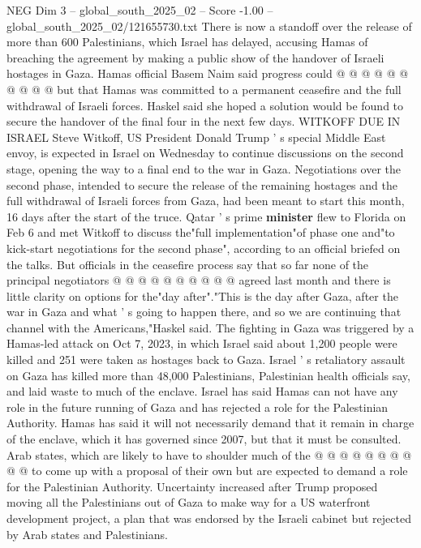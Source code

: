 \begin{textsample}{NEG Dim 3 – global\_south\_2025\_02 – Score -1.00 – global\_south\_2025\_02/121655730.txt}
There is now a standoff over the release of more than 600 Palestinians, which Israel has delayed, accusing Hamas of breaching the agreement by making a public show of the handover of Israeli hostages in Gaza.
Hamas official Basem Naim said progress could @ @ @ @ @ @ @ @ @ @ but that Hamas was committed to a permanent ceasefire and the full withdrawal of Israeli forces.
Haskel said she hoped a solution would be found to secure the handover of the final four in the next few days.
WITKOFF DUE IN ISRAEL Steve Witkoff, US President Donald Trump ' s special Middle East envoy, is expected in Israel on Wednesday to continue discussions on the second stage, opening the way to a final end to the war in Gaza.
Negotiations over the second phase, intended to secure the release of the remaining hostages and the full withdrawal of Israeli forces from Gaza, had been meant to start this month, 16 days after the start of the truce.
Qatar ' s prime \textbf{minister} flew to Florida on Feb 6 and met Witkoff to discuss the"full implementation"of phase one and"to kick-start negotiations for the second phase", according to an official briefed on the talks.
But officials in the ceasefire process say that so far none of the principal negotiators @ @ @ @ @ @ @ @ @ @ agreed last month and there is little clarity on options for the"day after"."This is the day after Gaza, after the war in Gaza and what ' s going to happen there, and so we are continuing that channel with the Americans,"Haskel said.
The fighting in Gaza was triggered by a Hamas-led attack on Oct 7, 2023, in which Israel said about 1,200 people were killed and 251 were taken as hostages back to Gaza.
Israel ' s retaliatory assault on Gaza has killed more than 48,000 Palestinians, Palestinian health officials say, and laid waste to much of the enclave.
Israel has said Hamas can not have any role in the future running of Gaza and has rejected a role for the Palestinian Authority.
Hamas has said it will not necessarily demand that it remain in charge of the enclave, which it has governed since 2007, but that it must be consulted.
Arab states, which are likely to have to shoulder much of the @ @ @ @ @ @ @ @ @ @ to come up with a proposal of their own but are expected to demand a role for the Palestinian Authority.
Uncertainty increased after Trump proposed moving all the Palestinians out of Gaza to make way for a US waterfront development project, a plan that was endorsed by the Israeli cabinet but rejected by Arab states and Palestinians.

\end{textsample}
